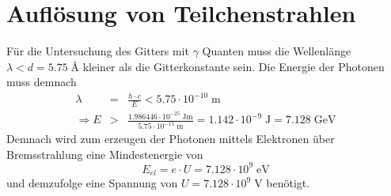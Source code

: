 \documentclass[12pt,DIV=15,a4paper,twoside,draft=false]{scrartcl}
\begin{document}
\section{Auflösung von Teilchenstrahlen}
Für die Untersuchung des Gitters mit $γ$ Quanten muss die Wellenlänge $λ < d = 5.75\;{}$\AA{} kleiner als die Gitterkonstante sein.
Die Energie der Photonen muss demnach
\begin{eqnarray*}
λ & = & \frac{h\cdot c}{E} < 5.75\cdot 10^{-10}\;\mathrm{m} \\
\Rightarrow E  & > & \frac{1.986446\cdot 10^{-25}\;\mathrm{J m}}{5.75\cdot 10^{-15}\;\mathrm{m}} = 1.142\cdot 10^{-9}\;\mathrm{J} = 7.128\;\mathrm{GeV}
\end{eqnarray*}
Demnach wird zum erzeugen der Photonen mittels Elektronen über Bremsstrahlung eine Mindestenergie von
$$ E_{el} = e\cdot U = 7.128\cdot 10^9\;\mathrm{eV}$$
und demzufolge eine Spannung von $U = 7.128\cdot 10^9\;\mathrm{V}$ benötigt.
\end{document}
